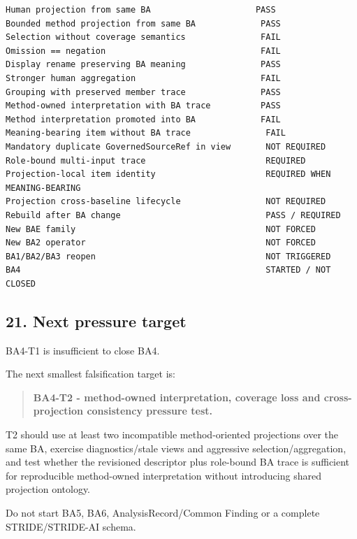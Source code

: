 \documentclass[11pt,a4paper]{article}
\begin{document}
\begin{verbatim}
Human projection from same BA                     PASS
Bounded method projection from same BA             PASS
Selection without coverage semantics               FAIL
Omission == negation                               FAIL
Display rename preserving BA meaning               PASS
Stronger human aggregation                         FAIL
Grouping with preserved member trace               PASS
Method-owned interpretation with BA trace          PASS
Method interpretation promoted into BA             FAIL
Meaning-bearing item without BA trace               FAIL
Mandatory duplicate GovernedSourceRef in view       NOT REQUIRED
Role-bound multi-input trace                        REQUIRED
Projection-local item identity                      REQUIRED WHEN MEANING-BEARING
Projection cross-baseline lifecycle                 NOT REQUIRED
Rebuild after BA change                             PASS / REQUIRED
New BAE family                                      NOT FORCED
New BA2 operator                                    NOT FORCED
BA1/BA2/BA3 reopen                                  NOT TRIGGERED
BA4                                                 STARTED / NOT CLOSED
\end{verbatim}

\subsection{21. Next pressure target}\label{21-next-pressure-target}

BA4-T1 is insufficient to close BA4.

The next smallest falsification target is:

\begin{quote}
\textbf{BA4-T2 - method-owned interpretation, coverage loss and cross-projection consistency pressure test.}
\end{quote}

T2 should use at least two incompatible method-oriented projections over the same BA, exercise diagnostics/stale views and aggressive selection/aggregation, and test whether the revisioned descriptor plus role-bound BA trace is sufficient for reproducible method-owned interpretation without introducing shared projection ontology.

Do not start BA5, BA6, AnalysisRecord/Common Finding or a complete STRIDE/STRIDE-AI schema.
\end{document}
